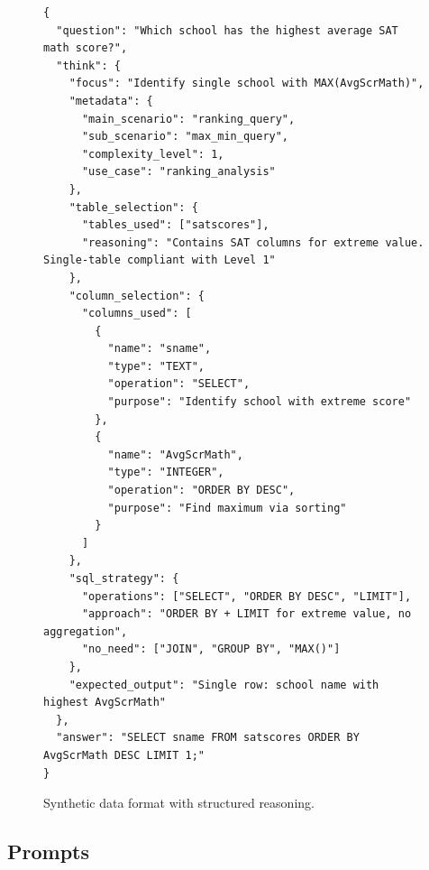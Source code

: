 \documentclass[letterpaper,journal]{IEEEtran}
\begin{document}

\begin{figure}[!ht]
\centering
\begin{tcolorbox}[
  width=.7\linewidth,
  enhanced,
  boxrule=0.5pt,
  colback=AliceBlue,
  colframe=Navy,
  colbacktitle=Navy,
  fonttitle=\bfseries\color{white}, 
  title=Synthetic data format with structured reasoning,
  arc=2mm,
  attach boxed title to top left={yshift=-2.5mm, xshift=3mm},
  boxed title style={arc=1mm},
  boxsep=5pt,
  left=8pt,
  right=8pt,
  top=6mm,
]
\begin{lstlisting}[style=jsonStyle]
{
  "question": "Which school has the highest average SAT math score?",
  "think": {
    "focus": "Identify single school with MAX(AvgScrMath)",
    "metadata": {
      "main_scenario": "ranking_query",
      "sub_scenario": "max_min_query",
      "complexity_level": 1,
      "use_case": "ranking_analysis"
    },
    "table_selection": {
      "tables_used": ["satscores"],
      "reasoning": "Contains SAT columns for extreme value. Single-table compliant with Level 1"
    },
    "column_selection": {
      "columns_used": [
        {
          "name": "sname",
          "type": "TEXT",
          "operation": "SELECT",
          "purpose": "Identify school with extreme score"
        },
        {
          "name": "AvgScrMath",
          "type": "INTEGER",
          "operation": "ORDER BY DESC",
          "purpose": "Find maximum via sorting"
        }
      ]
    },
    "sql_strategy": {
      "operations": ["SELECT", "ORDER BY DESC", "LIMIT"],
      "approach": "ORDER BY + LIMIT for extreme value, no aggregation",
      "no_need": ["JOIN", "GROUP BY", "MAX()"]
    },
    "expected_output": "Single row: school name with highest AvgScrMath"
  },
  "answer": "SELECT sname FROM satscores ORDER BY AvgScrMath DESC LIMIT 1;"
}
\end{lstlisting}
\end{tcolorbox}
\caption{Synthetic data format with structured reasoning.}
\label{fig:training_data_format}
\end{figure}

\clearpage

\subsection{Prompts}
\label{app:prompts}
\end{document}
